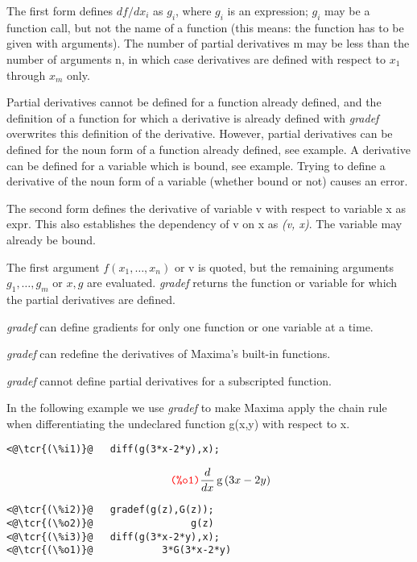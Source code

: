 \documentclass[../Maxima_Workbook.tex]{subfiles}
\begin{document}
\lz The first form defines $ df/dx_i $ as $ g_i $, where $ g_i $ is an expression; $ g_i $ may be a function call, but not the name of a function (this means: the function has to be given with arguments). The number of partial derivatives m may be less than the number of arguments n, in which case derivatives are defined with respect to $ x_1 $ through $ x_m $ only. 

\lz Partial derivatives cannot be defined for a function already defined, and the definition of a function for which a derivative is already defined with \emph{gradef} overwrites this definition of the derivative. However, partial derivatives can be defined for the noun form of a function already defined, see example. A derivative can be defined for a variable which is bound, see example. Trying to define a derivative of the noun form of a variable (whether bound or not) causes an error.

\lz The second form defines the derivative of variable v with respect to variable x as expr. This also establishes the dependency of v on x as \emph{(v, x)}. The variable may already be bound.

\lz The first argument $ f(x_1,\dots,x_n) $ or v is quoted, but the remaining arguments $ g_1,\dots,g_m $ or $ x,g $ are evaluated. \emph{gradef} returns the function or variable for which the partial derivatives are defined.

\lz \emph{gradef} can define gradients for only one function or one variable at a time.

\lz \emph{gradef} can redefine the derivatives of Maxima’s built-in functions. 

\lz \emph{gradef} cannot define partial derivatives for a subscripted function.

\lz In the following example we use \emph{gradef} to make Maxima apply the chain rule when differentiating the undeclared function g(x,y) with respect to x.

\lz \begin{small}
\color{blue} \leqn
\begin{lstlisting}
<@\tcr{(\%i1)}@   diff(g(3*x-2*y),x);
\end{lstlisting}
\vspace{-4mm} \[\tag*{\tcr{\ttfamily (\%o1)}} \frac{d}{d x} \operatorname{g}\left( 3 x-2 y\right)  \]
\vspace{-5mm} \begin{lstlisting}
<@\tcr{(\%i2)}@   gradef(g(z),G(z));
<@\tcr{(\%o2)}@			        g(z)
<@\tcr{(\%i3)}@   diff(g(3*x-2*y),x);	
<@\tcr{(\%o1)}@			   3*G(3*x-2*y)
\end{lstlisting}
\color{black} \reqn
\end{small}
\end{document}
